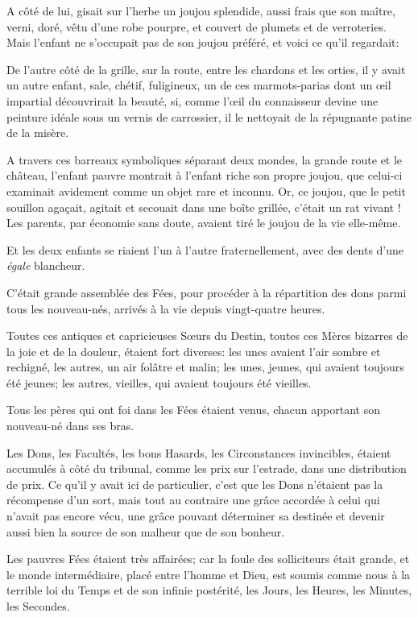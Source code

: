A côté de lui, gisait sur l’herbe un joujou splendide,
aussi frais que son maître, verni, doré, vêtu d’une
robe pourpre, et couvert de plumets et de verroteries. Mais
l’enfant ne s’occupait pas de son
joujou préféré, et voici ce qu’il regardait:

De l’autre côté de la grille, sur la route, entre les
chardons et les orties, il y avait un autre enfant, sale, chétif,
fuligineux, un de ces marmots{}-parias dont un \oe il impartial
découvrirait la beauté, si, comme l’\oe il du
connaisseur devine une peinture idéale sous un vernis de carrossier, il
le nettoyait de la répugnante patine de la misère.

A travers ces barreaux symboliques séparant deux mondes, la grande route
et le château, l’enfant pauvre montrait à
l’enfant riche son propre joujou, que celui{}-ci
examinait avidement comme un objet rare et inconnu. Or, ce joujou, que
le petit souillon agaçait, agitait et secouait dans une boîte grillée,
c’était un rat vivant ! Les parents, par économie sans
doute, avaient tiré le joujou de la vie elle{}-même.

Et les deux enfants se riaient l’un à
l’autre fraternellement, avec des dents
d’une \textit{égale} blancheur.


C’était grande assemblée des Fées, pour procéder à la
répartition des dons parmi tous les nouveau{}-nés, arrivés à la vie
depuis vingt{}-quatre heures.

Toutes ces antiques et capricieuses S\oe urs du Destin, toutes ces Mères
bizarres de la joie et de la douleur, étaient fort diverses: les unes
avaient l’air sombre et rechigné, les autres, un air
folâtre et malin; les unes, jeunes, qui avaient toujours été jeunes;
les autres, vieilles, qui avaient toujours été vieilles.

Tous les pères qui ont foi dans les Fées étaient venus, chacun apportant
son nouveau{}-né dans ses bras.

Les Dons, les Facultés, les bons Hasards, les Circonstances invincibles,
étaient accumulés à côté du tribunal, comme les prix sur
l’estrade, dans une distribution de prix. Ce
qu’il y avait ici de particulier,
c’est que les Dons n’étaient pas la
récompense d’un sort, mais tout au contraire une grâce
accordée à celui qui n’avait pas encore vécu, une
grâce pouvant déterminer sa destinée et devenir aussi bien la source de
son malheur que de son bonheur.

Les pauvres Fées étaient très affairées; car la foule des solliciteurs
était grande, et le monde intermédiaire, placé entre
l’homme et Dieu, est soumis comme nous à la terrible
loi du Temps et de son infinie postérité, les Jours, les Heures, les
Minutes, les Secondes.


